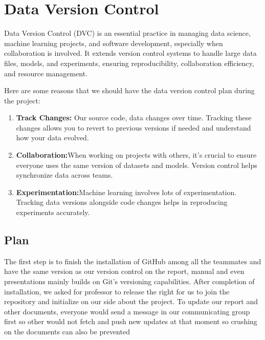 %
%

\chapter{Data Version Control}

Data Version Control (DVC) is an essential practice in managing data science, machine learning projects, and software development, especially when collaboration is involved. It extends version control systems to handle large data files, models, and experiments, ensuring reproducibility, collaboration efficiency, and resource management.

Here are some reasons that we should have the data version control plan during the project:
\begin{enumerate}
	\item \textbf{Track Changes:}
	Our source code, data changes over time. Tracking these changes allows you to revert to previous versions if needed and understand how your data evolved.
	\item \textbf{Collaboration:}When working on projects with others, it's crucial to ensure everyone uses the same version of datasets and models. Version control helps synchronize data across teams.
	\item \textbf{Experimentation:}Machine learning involves lots of experimentation. Tracking data versions alongside code changes helps in reproducing experiments accurately.
\end{enumerate}

\section{Plan}
The first step is to finish the installation of GitHub among all the teammates and have the same version as our version control on the report, manual and even presentations mainly builds on Git's versioning capabilities. After completion of installation, we asked for professor to release the right for us to join the repository and initialize on our side about the project. To update our report and other documents, everyone would send a message in our communicating group first so other would not fetch and push new updates at that moment so crushing on the documents can also be prevented

